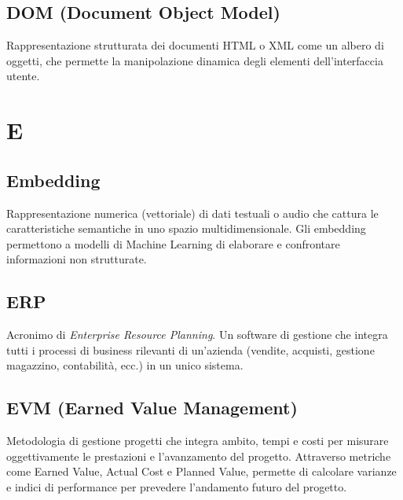 \documentclass[a4paper, 11pt, oneside]{scrartcl} %
\begin{document}
\subsection*{DOM (Document Object Model)}
Rappresentazione strutturata dei documenti HTML o XML come un albero di oggetti, che permette la manipolazione dinamica degli elementi dell'interfaccia utente.
\vspace{0.5cm}



\section*{E}


\subsection*{Embedding}
Rappresentazione numerica (vettoriale) di dati testuali o audio che cattura le caratteristiche semantiche in uno spazio multidimensionale. Gli embedding permettono a modelli di Machine Learning di elaborare e confrontare informazioni non strutturate.
\vspace{0.5cm}

\subsection*{ERP}
Acronimo di \textit{Enterprise Resource Planning}. Un software di gestione che integra tutti i processi di business rilevanti di un'azienda (vendite, acquisti, gestione magazzino, contabilità, ecc.) in un unico sistema.
\vspace{0.5cm}

\subsection*{EVM (Earned Value Management)}
Metodologia di gestione progetti che integra ambito, tempi e costi per misurare oggettivamente le prestazioni e l'avanzamento del progetto. Attraverso metriche come Earned Value, Actual Cost e Planned Value, permette di calcolare varianze e indici di performance per prevedere l'andamento futuro del progetto.
\vspace{0.5cm}
\end{document}

